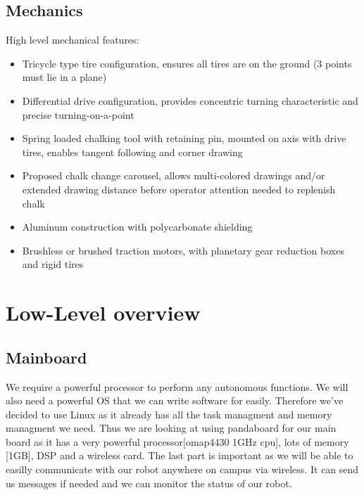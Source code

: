 \documentclass{article}
\begin{document}
\subsection{Mechanics}
High level mechanical features:
\begin{itemize}
\item Tricycle type tire configuration, ensures all tires are on the  ground (3 points must lie in a plane)
\item Differential drive configuration, provides concentric turning characteristic and precise turning-on-a-point
\item Spring loaded chalking tool with retaining pin, mounted on axis with drive tires, enables tangent following and corner drawing
\item Proposed chalk change carousel, allows multi-colored drawings and/or extended drawing distance before operator attention needed to replenish chalk
\item Aluminum construction with polycarbonate shielding
\item Brushless or brushed traction motors, with planetary gear reduction boxes and rigid tires
\end{itemize}
\section {Low-Level overview}
\subsection{Mainboard}
We require a powerful processor to perform any autonomous functions. We will also need a powerful OS that we can write software for easily. Therefore we've decided to use Linux as it already has all the task managment and memory managment we need. Thus we are looking at using pandaboard for our main board as it has a very powerful processor[omap4430 1GHz cpu], lots of memory [1GB], DSP and a wireless card. The last part is important as we will be able to easilly communicate with our robot anywhere on campus via wireless. It can send us messages if needed and we can monitor the status of our robot.
\end{document}

